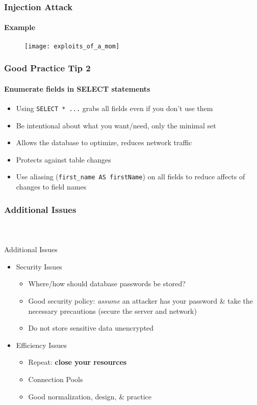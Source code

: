 \documentclass{beamer}
\begin{document}
\begin{frame}[fragile]
  \frametitle{Injection Attack}
  \framesubtitle{Example}

\begin{figure}
\centering
\texttt{[image: exploits\_of\_a\_mom]}
\end{figure}

\end{frame}

\begin{frame}[fragile]
  \frametitle{Good Practice Tip 2}
  \framesubtitle{Enumerate fields in SELECT statements}

\begin{itemize}
  \item Using \texttt{SELECT * ...} grabs all fields even if you don't use them
  \item Be intentional about what you want/need, only the minimal set
  \item Allows the database to optimize, reduces network traffic
  \item Protects against table changes
  \item Use aliasing (\texttt{first_name AS firstName}) on all fields to reduce affects of changes to field names
\end{itemize}

\end{frame}

\begin{frame}[fragile]
  \frametitle{Additional Issues}
  \framesubtitle{~}

Additional Issues
\begin{itemize}
  \item Security Issues
  \begin{itemize}
    \item Where/how should database passwords be stored?
    \item Good security policy: \emph{assume} an attacker has your password \& 
	  take the necessary precautions (secure the server and network)
    \item Do not store sensitive data unencrypted
  \end{itemize}
  \item Efficiency Issues
  \begin{itemize}
    \item \alert{Repeat}: \textbf{close your resources}
    \item Connection Pools
    \item Good normalization, design, \& practice
  \end{itemize}
\end{itemize}

\end{frame}
\end{document}
